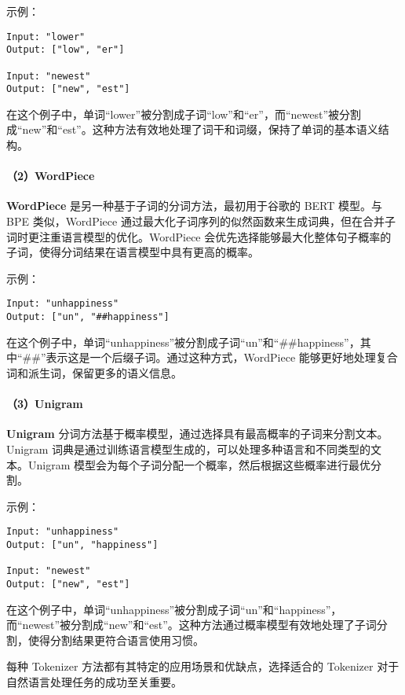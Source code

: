\documentclass[12pt,a4paper]{book}
\begin{document}
示例：

\begin{verbatim}
Input: "lower"
Output: ["low", "er"]

Input: "newest"
Output: ["new", "est"]
\end{verbatim}

在这个例子中，单词``lower''被分割成子词``low''和``er''，而``newest''被分割成``new''和``est''。这种方法有效地处理了词干和词缀，保持了单词的基本语义结构。

\paragraph{（2）WordPiece}\label{wordpiece}

\textbf{WordPiece} 是另一种基于子词的分词方法，最初用于谷歌的 BERT
模型。与 BPE 类似，WordPiece
通过最大化子词序列的似然函数来生成词典，但在合并子词时更注重语言模型的优化。WordPiece
会优先选择能够最大化整体句子概率的子词，使得分词结果在语言模型中具有更高的概率。

示例：

\begin{verbatim}
Input: "unhappiness"
Output: ["un", "##happiness"]
\end{verbatim}

在这个例子中，单词``unhappiness''被分割成子词``un''和``\#\#happiness''，其中``\#\#''表示这是一个后缀子词。通过这种方式，WordPiece
能够更好地处理复合词和派生词，保留更多的语义信息。

\paragraph{（3）Unigram}\label{unigram}

\textbf{Unigram}
分词方法基于概率模型，通过选择具有最高概率的子词来分割文本。Unigram
词典是通过训练语言模型生成的，可以处理多种语言和不同类型的文本。Unigram
模型会为每个子词分配一个概率，然后根据这些概率进行最优分割。

示例：

\begin{verbatim}
Input: "unhappiness"
Output: ["un", "happiness"]

Input: "newest"
Output: ["new", "est"]
\end{verbatim}

在这个例子中，单词``unhappiness''被分割成子词``un''和``happiness''，而``newest''被分割成``new''和``est''。这种方法通过概率模型有效地处理了子词分割，使得分割结果更符合语言使用习惯。

每种 Tokenizer 方法都有其特定的应用场景和优缺点，选择适合的 Tokenizer
对于自然语言处理任务的成功至关重要。
\end{document}
